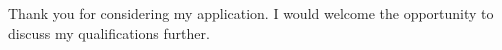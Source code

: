 \documentclass[11pt, a4paper]{awesome-cv}
\begin{document}
	Thank you for considering my application. I would welcome the opportunity to discuss my qualifications further.
	
	\makeletterclosing
\end{document}
